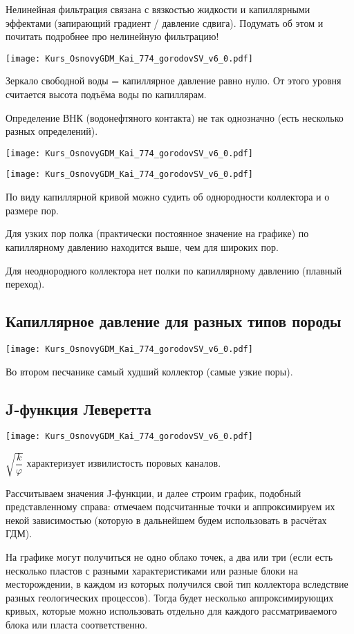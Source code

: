 \documentclass[main.tex]{subfiles}
\begin{document}
Нелинейная фильтрация связана с вязкостью жидкости и капиллярными эффектами (запирающий градиент / давление сдвига). Подумать об этом и почитать подробнее про нелинейную фильтрацию!

\texttt{[image: Kurs\_OsnovyGDM\_Kai\_774\_gorodovSV\_v6\_0.pdf]}

Зеркало свободной воды = капиллярное давление равно нулю.
От этого уровня считается высота подъёма воды по капиллярам.

Определение ВНК (водонефтяного контакта) не так однозначно (есть несколько разных определений).

\texttt{[image: Kurs\_OsnovyGDM\_Kai\_774\_gorodovSV\_v6\_0.pdf]}

\texttt{[image: Kurs\_OsnovyGDM\_Kai\_774\_gorodovSV\_v6\_0.pdf]}

По виду капиллярной кривой можно судить об однородности коллектора и о размере пор.

Для узких пор полка (практически постоянное значение на графике) по капиллярному давлению находится выше, чем для широких пор.

Для неоднородного коллектора нет полки по капиллярному давлению (плавный переход).

\subsection{Капиллярное давление для разных типов породы}

\texttt{[image: Kurs\_OsnovyGDM\_Kai\_774\_gorodovSV\_v6\_0.pdf]}

Во втором песчанике самый худший коллектор (самые узкие поры).

\subsection{J-функция Леверетта}

\texttt{[image: Kurs\_OsnovyGDM\_Kai\_774\_gorodovSV\_v6\_0.pdf]}

$\sqrt{\dfrac{k}{\varphi}}$ характеризует извилистость поровых каналов.

Рассчитываем значения J-функции, и далее строим график, подобный представленному справа: отмечаем подсчитанные точки и аппроксимируем их некой зависимостью (которую в дальнейшем будем использовать в расчётах ГДМ).

На графике могут получиться не одно облако точек, а два или три (если есть несколько пластов с разными характеристиками или разные блоки на месторождении, в каждом из которых получился свой тип коллектора вследствие разных геологических процессов).
Тогда будет несколько аппроксимирующих кривых, которые можно использовать отдельно для каждого рассматриваемого блока или пласта соответственно.
\end{document}
